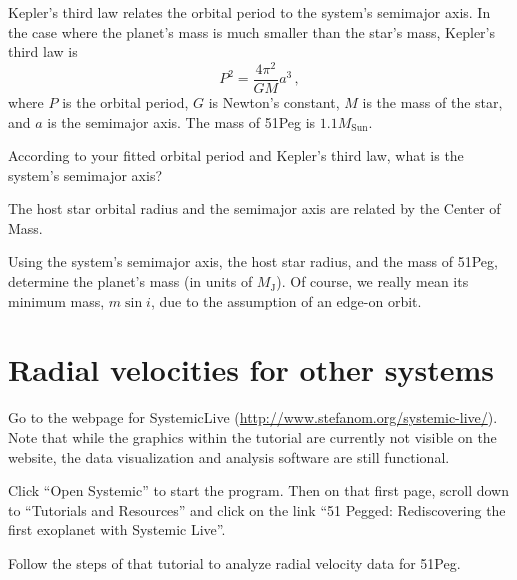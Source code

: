 Kepler's third law relates the orbital period to the system's semimajor axis. In the case where the planet’s mass is much smaller than the star’s mass, Kepler's third law is
\begin{equation}
 P^2=\frac{4 \pi^2}{GM} a^3 \,,
\end{equation}
where $P$ is the orbital period, $G$ is Newton's constant, $M$ is the mass of the star, and $a$ is the semimajor axis. The mass of 51Peg is $1.1 M_\textrm{Sun}$.

\begin{steps}
	\item According to your fitted orbital period and Kepler's third law, what is the system's semimajor axis?
\end{steps}

The host star orbital radius and the semimajor axis are related by the Center of Mass.


\begin{steps}
	\item Using the system's semimajor axis, the host star radius, and the mass of 51Peg, determine the planet’s mass (in units of $M_\textrm{J}$). Of course, we really mean its minimum mass, $m \sin i$, due to the assumption of an edge-on orbit. 
\end{steps}

\section{Radial velocities for other systems}

\begin{steps}
	\item Go to the webpage for SystemicLive (\url{http://www.stefanom.org/systemic-live/}). Note that while the graphics within the tutorial are currently not visible on the website, the data visualization and analysis software are still functional.
	
	\item Click ``Open Systemic'' to start the program. Then on that first page, scroll down to ``Tutorials and Resources'' and click on the link ``51 Pegged: Rediscovering the first exoplanet with Systemic Live''.
	
	\item Follow the steps of that tutorial to analyze radial velocity data for 51Peg.
\end{steps}

